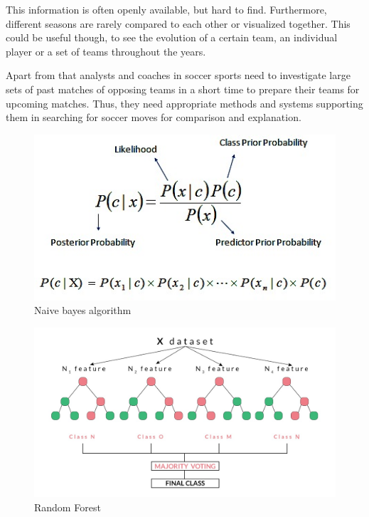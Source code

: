 \documentclass[journal]{IEEEtran}
\begin{document}
This information is often openly available, but hard to find. Furthermore, different seasons are rarely compared to each other or visualized together. This could be useful though, to see the evolution of a certain team, an individual player or a set of teams throughout the years.

Apart from that analysts and coaches in soccer sports need to investigate large sets of past matches of opposing teams in a short time to prepare their teams for upcoming matches. Thus, they need appropriate methods and systems supporting them in searching for soccer moves for comparison and explanation.
\begin{figure}
  \includegraphics[width=\linewidth]{naive-bayes.jpeg}
  \caption{Naive bayes algorithm}
  \label{fig:algo1}
\end{figure}

\begin{figure}
  \includegraphics[width=\linewidth]{random-forest.jpeg}
  \caption{Random Forest}
  \label{fig:algo2}
\end{figure}

\end{document}
